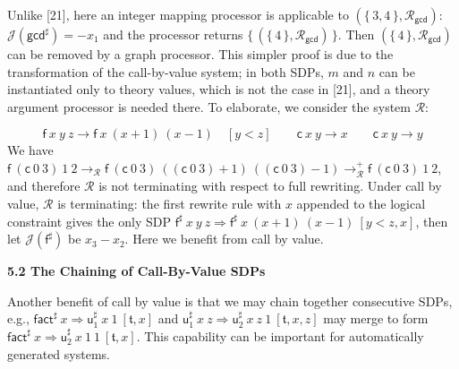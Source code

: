 \documentclass[10pt,a4paper]{amsart}
\begin{document}
 
Unlike [21], here an integer mapping processor is applicable to $(\{\,\text{3},\text{4}\,\},\mathcal{R}_{\mathsf{gcd}})$: $\mathcal{J}(\mathsf{gcd}^{\sharp})={-x_{1}}$ and the processor returns $\{\,(\{\,\text{4}\,\},\mathcal{R}_{\mathsf{gcd}})\,\}$. Then $(\{\,\text{4}\,\},\mathcal{R}_{\mathsf{gcd}})$ can be removed by a graph processor. This simpler proof is due to the transformation of the call-by-value system; in both SDPs, $m$ and $n$ can be instantiated only to theory values, which is not the case in [21], and a theory argument processor is needed there. To elaborate, we consider the system $\mathcal{R}$:\par
    \[{{{\mathsf{f}}\ {x}}\ {y}}\ {z}\rightarrow{{{\mathsf{f}}\ {x}}\ {(x+1)}}\ {(x-1)}\quad[y<z]\qquad{{\mathsf{c}}\ {x}}\ {y}\rightarrow x\qquad{{\mathsf{c}}\ {x}}\ {y}\rightarrow y\]    
We have ${{{\mathsf{f}}\ {({{\mathsf{c}}\ {0}}\ {3})}}\ {1}}\ {2}\rightarrow_{\mathcal{R}}{{{\mathsf{f}}\ {({{\mathsf{c}}\ {0}}\ {3})}}\ {(({{\mathsf{c}}\ {0}}\ {3})+1)}}\ {(({{\mathsf{c}}\ {0}}\ {3})-1)}\rightarrow_{\mathcal{R}}^{+}{{{\mathsf{f}}\ {({{\mathsf{c}}\ {0}}\ {3})}}\ {1}}\ {2}$, and therefore $\mathcal{R}$ is not terminating with respect to full rewriting. Under call by value, $\mathcal{R}$ is terminating: the first rewrite rule with $x$ appended to the logical constraint gives the only SDP ${{{{\mathsf{f}^{\sharp}}\ {x}}\ {y}}\ {z}}\Rightarrow{{{{\mathsf{f}^{\sharp}}\ {x}}\ {(x+1)}}\ {(x-1)}}\ [y<z,x]$, then let $\mathcal{J}(\mathsf{f}^{\sharp})$ be $x_{3}-x_{2}$. Here we benefit from call by value.\par
 
 
 
 
\par\medskip\noindent\textbf{5.2 The Chaining of Call-By-Value SDPs}\par
 
 
Another benefit of call by value is that we may chain together consecutive SDPs, e.g., ${{\mathsf{fact}^{\sharp}}\ {x}}\Rightarrow{{{\mathsf{u}_{1}^{\sharp}}\ {x}}\ {1}}\ [\mathfrak{t},x]$ and ${{{\mathsf{u}_{1}^{\sharp}}\ {x}}\ {z}}\Rightarrow{{{{\mathsf{u}_{2}^{\sharp}}\ {x}}\ {z}}\ {1}}\ [\mathfrak{t},x,z]$ may merge to form ${{\mathsf{fact}^{\sharp}}\ {x}}\Rightarrow{{{{\mathsf{u}_{2}^{\sharp}}\ {x}}\ {1}}\ {1}}\ [\mathfrak{t},x]$. This capability can be important for automatically generated systems.\par
 
\end{document}

